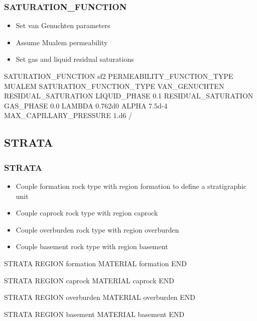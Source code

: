 \documentclass{beamer}
\newcommand\greencomment[1]{{{\color{green} #1}}}
\begin{document}
\begin{frame}[fragile]\frametitle{SATURATION\_FUNCTION}

\begin{itemize}
\item Set van Genuchten parameters
\item Assume Mualem permeability
\item Set gas and liquid residual saturations
\end{itemize}

\begin{semiverbatim}
SATURATION_FUNCTION sf2
  PERMEABILITY_FUNCTION_TYPE MUALEM
  SATURATION_FUNCTION_TYPE VAN_GENUCHTEN
  RESIDUAL_SATURATION LIQUID_PHASE 0.1
  RESIDUAL_SATURATION GAS_PHASE 0.0
  LAMBDA 0.762d0
  ALPHA 7.5d-4
  MAX_CAPILLARY_PRESSURE 1.d6
/
\end{semiverbatim}

\end{frame}

\subsection{STRATA}

\begin{frame}\frametitle{STRATA}

\begin{itemize}
\item Couple \greencomment{formation} rock type with region \greencomment{formation} to define a stratigraphic unit
\item Couple \greencomment{caprock} rock type with region \greencomment{caprock}
\item Couple \greencomment{overburden} rock type with region \greencomment{overburden}
\item Couple \greencomment{basement} rock type with region \greencomment{basement}
\end{itemize}

\begin{semiverbatim}

STRATA
  REGION formation
  MATERIAL formation
END

STRATA
  REGION caprock
  MATERIAL caprock
END

STRATA
  REGION overburden
  MATERIAL overburden
END

STRATA
  REGION basement
  MATERIAL basement
END


\end{semiverbatim}

\end{frame}
\end{document}
